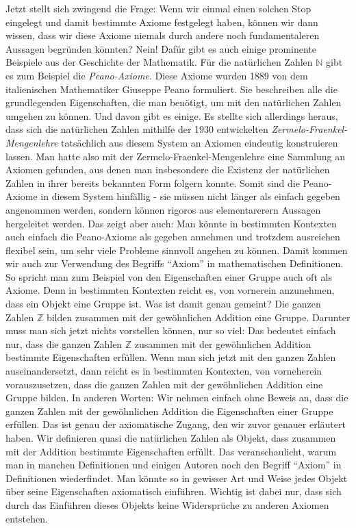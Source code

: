 \documentclass[11pt,reqno, a4paper]{book}
\theoremstyle{mystyle}
\theoremstyle{definition}
\numberwithin{equation}{chapter}
\begin{document}
Jetzt stellt sich zwingend die Frage: Wenn wir einmal einen solchen Stop eingelegt und damit bestimmte Axiome festgelegt haben, können wir dann wissen, dass wir diese Axiome niemals durch andere noch fundamentaleren Aussagen begründen könnten? Nein! Dafür gibt es auch einige prominente Beispiele aus der Geschichte der Mathematik. Für die natürlichen Zahlen \(\mathbb N\) gibt es zum Beispiel die \textit{Peano-Axiome}. Diese Axiome wurden 1889 von dem italienischen Mathematiker Giuseppe Peano formuliert. Sie beschreiben alle die grundlegenden Eigenschaften, die man benötigt, um mit den natürlichen Zahlen umgehen zu können. Und davon gibt es einige. Es stellte sich allerdings heraus, dass sich die natürlichen Zahlen mithilfe der 1930 entwickelten \textit{Zermelo-Fraenkel-Mengenlehre} tatsächlich aus diesem System an Axiomen eindeutig konstruieren lassen. Man hatte also mit der Zermelo-Fraenkel-Mengenlehre eine Sammlung an Axiomen gefunden, aus denen man insbesondere die Existenz der natürlichen Zahlen in ihrer bereits bekannten Form folgern konnte. Somit sind die Peano-Axiome in diesem System hinfällig - sie müssen nicht länger als einfach gegeben angenommen werden, sondern können rigoros aus elementarerern Aussagen hergeleitet werden. Das zeigt aber auch: Man könnte in bestimmten Kontexten auch einfach die Peano-Axiome als gegeben annehmen und trotzdem ausreichen flexibel sein, um sehr viele Probleme sinnvoll angehen zu können. Damit kommen wir auch zur Verwendung des Begriffs "`Axiom"' in mathematischen Definitionen. So spricht man zum Beispiel von den Eigenschaften einer Gruppe auch oft als Axiome. Denn in bestimmten Kontexten reicht es, von vornerein anzunehmen, dass ein Objekt eine Gruppe ist. Was ist damit genau gemeint? Die ganzen Zahlen \(\mathbb Z\) bilden zusammen mit der gewöhnlichen Addition eine Gruppe. Darunter muss man sich jetzt nichts vorstellen können, nur so viel: Das bedeutet einfach nur, dass die ganzen Zahlen \(\mathbb Z\) zusammen mit der gewöhnlichen Addition bestimmte Eigenschaften erfüllen. Wenn man sich jetzt mit den ganzen Zahlen auseinandersetzt, dann reicht es in bestimmten Kontexten, von vorneherein vorauszusetzen, dass die ganzen Zahlen mit der gewöhnlichen Addition eine Gruppe bilden. In anderen Worten: Wir nehmen einfach ohne Beweis an, dass die ganzen Zahlen mit der gewöhnlichen Addition die Eigenschaften einer Gruppe erfüllen. Das ist genau der axiomatische Zugang, den wir zuvor genauer erläutert haben. Wir definieren quasi die natürlichen Zahlen als Objekt, dass zusammen mit der Addition bestimmte Eigenschaften erfüllt. Das veranschaulicht, warum man in manchen Definitionen und einigen Autoren noch den Begriff "`Axiom"' in Definitionen wiederfindet. Man könnte so in gewisser Art und Weise jedes Objekt über seine Eigenschaften axiomatisch einführen. Wichtig ist dabei nur, dass sich durch das Einführen dieses Objekts keine Widersprüche zu anderen Axiomen entstehen. 
\end{document}
